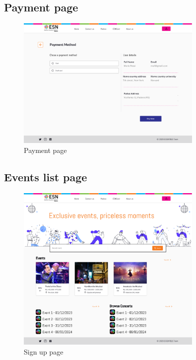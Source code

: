 \subsection{Payment page}
\begin{figure}[h!]
    \centering
    \includegraphics[width=0.8\textwidth]{images/PaymentMethod.png}
    \caption{Payment page}
    \label{fig:payment}
\end{figure}
\lipsum[1]
\subsection{Events list page}
\begin{figure}[h!]
    \centering
    \includegraphics[width=0.8\textwidth]{images/EventList.png}
    \caption{Sign up page}
    \label{fig:events}
\end{figure}
\lipsum[1]

